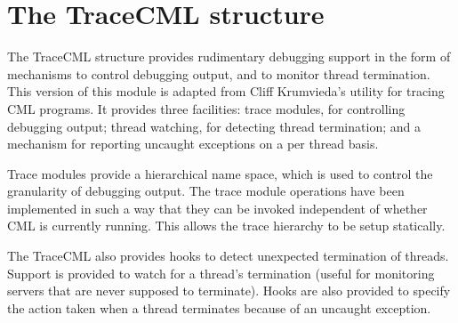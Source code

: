 \maybeclearpage
\section{The {\cf Trace\-CML} structure}


The {\cf \small Trace\-CML} structure provides rudimentary debugging support in the form of mechanisms to control debugging output, and to monitor thread termination. This version of this module is adapted from Cliff Krumvieda's utility for tracing CML programs. It provides three facilities: trace modules, for controlling debugging output; thread watching, for detecting thread termination; and a mechanism for reporting uncaught exceptions on a per thread basis.

Trace modules provide a hierarchical name space, which is used to control the granularity of debugging output. The trace module operations have been implemented in such a way that they can be invoked independent of whether CML is currently running. This allows the trace hierarchy to be setup statically.

The {\cf \small Trace\-CML} also provides hooks to detect unexpected termination of threads. Support is provided to watch for a thread's termination (useful for monitoring servers that are never supposed to terminate). Hooks are also provided to specify the action taken when a thread terminates because of an uncaught exception.
\begin{synopsis}
\item {} \label{sig-TRACE_CML}
\item {\STRUCTURE} \label{str-TraceCML}
\end{synopsis}

